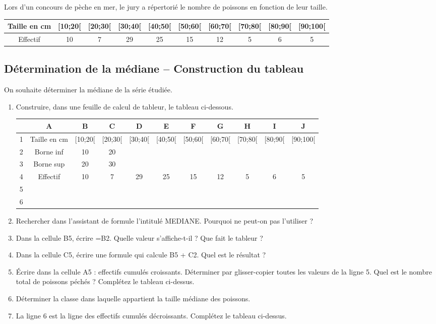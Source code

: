
Lors d'un concours de pèche en mer, le jury a répertorié le nombre de poissons en fonction de leur taille.

\begin{tabular}{|c|c|c|c|c|c|c|c|c|c|}
\hline  
Taille en cm& [10;20[& [20;30[& [30;40[ &[40;50[ &[50;60[& [60;70[& [70;80[& [80;90[& [90;100[\\ 
\hline  
Effectif &10 &7& 29& 25& 15& 12& 5& 6 &5\\ 
\hline 
\end{tabular}

\subsection*{Détermination de la médiane – Construction du tableau}
On souhaite déterminer la médiane de la série étudiée.
\begin{enumerate}
\item Construire, dans une feuille de calcul de tableur, le tableau ci-dessous.

\begin{tabular}{|c|c|c|c|c|c|c|c|c|c|c|}
\hline
\rowcolor{gray}&A &B &C &D& E &F &G &H& I& J\\
\hline
\cellcolor{gray}1& Taille en cm& [10;20[& [20;30[ &[30;40[ &[40;50[& [50;60[& [60;70[ &[70;80[ &[80;90[& [90;100[\\
\hline
\cellcolor{gray}2& Borne inf& 10& 20&&&&&&&\\
\hline
\cellcolor{gray}3& Borne sup &20& 30&&&&&&&\\
\hline
\cellcolor{gray}4& Effectif &10& 7& 29& 25& 15& 12 &5 &6& 5\\
\hline
\cellcolor{gray}5 &&&&&&&&&&\\
\hline
\cellcolor{gray}6 &&&&&&&&&&\\
\hline
\end{tabular}
\item Rechercher dans l'assistant de formule l'intitulé MEDIANE. Pourquoi ne peut-on pas l'utiliser ?
\item Dans la cellule B5, écrire =B2. Quelle valeur s'affiche-t-il ? Que fait le tableur ?
\item Dans la cellule C5, écrire une formule qui calcule B5 + C2. Quel est le résultat ?
\item Écrire dans la cellule A5 : effectifs cumulés croissants. Déterminer par glisser-copier toutes les
valeurs de la ligne 5. Quel est le nombre total de poissons péchés ? Complétez le tableau ci-dessus.
\item Déterminer la classe dans laquelle appartient la taille médiane des poissons.
\item La ligne 6 est la ligne des effectifs cumulés décroissants. Complétez le tableau ci-dessus.

\end{enumerate}


